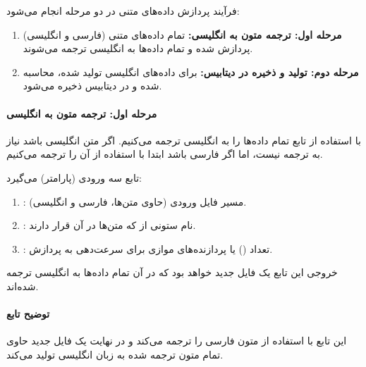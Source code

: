 \documentclass{article}
\begin{document}
فرآیند پردازش داده‌های متنی در دو مرحله انجام می‌شود:
\begin{enumerate}
    \item \textbf{مرحله اول: ترجمه متون به انگلیسی:} تمام داده‌های متنی (فارسی و انگلیسی) پردازش شده و تمام داده‌ها به انگلیسی ترجمه می‌شوند.
    \item \textbf{مرحله دوم: تولید  و ذخیره در دیتابیس:} برای داده‌های انگلیسی تولید شده،  محاسبه شده و در دیتابیس  ذخیره می‌شود.
\end{enumerate}


\paragraph{مرحله اول: ترجمه متون به انگلیسی}
\label{par:prepare-final-csv-intro}

با استفاده از تابع  تمام داده‌ها را به انگلیسی ترجمه می‌کنیم. اگر متن انگلیسی باشد نیاز به ترجمه نیست، اما اگر فارسی باشد ابتدا با استفاده از  آن را ترجمه می‌کنیم.

تابع  سه ورودی (پارامتر) می‌گیرد:
\begin{enumerate}
    \item {}: مسیر فایل  ورودی (حاوی متن‌ها، فارسی و انگلیسی).
    \item {}: نام ستونی از  که متن‌ها در آن قرار دارند.
    \item {}: تعداد () یا پردازنده‌های موازی برای سرعت‌دهی به پردازش.
\end{enumerate}
خروجی این تابع یک فایل  جدید خواهد بود که در آن تمام داده‌ها به انگلیسی ترجمه شده‌اند.

\paragraph{توضیح تابع }

این تابع با استفاده از  متون فارسی را ترجمه می‌کند و در نهایت یک فایل  جدید حاوی تمام متون ترجمه شده به زبان انگلیسی تولید می‌کند.
\end{document}
